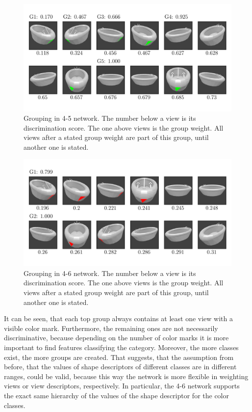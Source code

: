 \begin{figure}
	\centering
	\includegraphics[trim=10 20 10 20, clip]{images/mn-sl-4-5-20/bathtub_0107_4_grouping.png}
	\caption[Grouping in 4-5 network]{Grouping in 4-5 network. The number below a view is its discrimination score. The one above views is the group weight. All views after a stated group weight are part of this group, until another one is stated.}
	\label{fig:grouping-4-5}
\end{figure}
\begin{figure}
	\centering
	\includegraphics[trim=10 20 10 20, clip]{images/mn-sl-4-6-20/bathtub_0107_5_grouping.png}
	\caption[Grouping in 4-6 network]{Grouping in 4-6 network. The number below a view is its discrimination score. The one above views is the group weight. All views after a stated group weight are part of this group, until another one is stated.}
	\label{fig:grouping-4-6}
\end{figure}
It can be seen, that each top group always contains at least one view with a visible color mark.
Furthermore, the remaining ones are not necessarily discriminative, because depending on the number of color marks it is more important to find features classifying the category.
Moreover, the more classes exist, the more groups are created.
That suggests, that the assumption from before, that the values of shape descriptors of different classes are in different ranges, could be valid, because this way the network is more flexible in weighting views or view descriptors, respectively.
In particular, the 4-6 network supports the exact same hierarchy of the values of the shape descriptor for the color classes.

